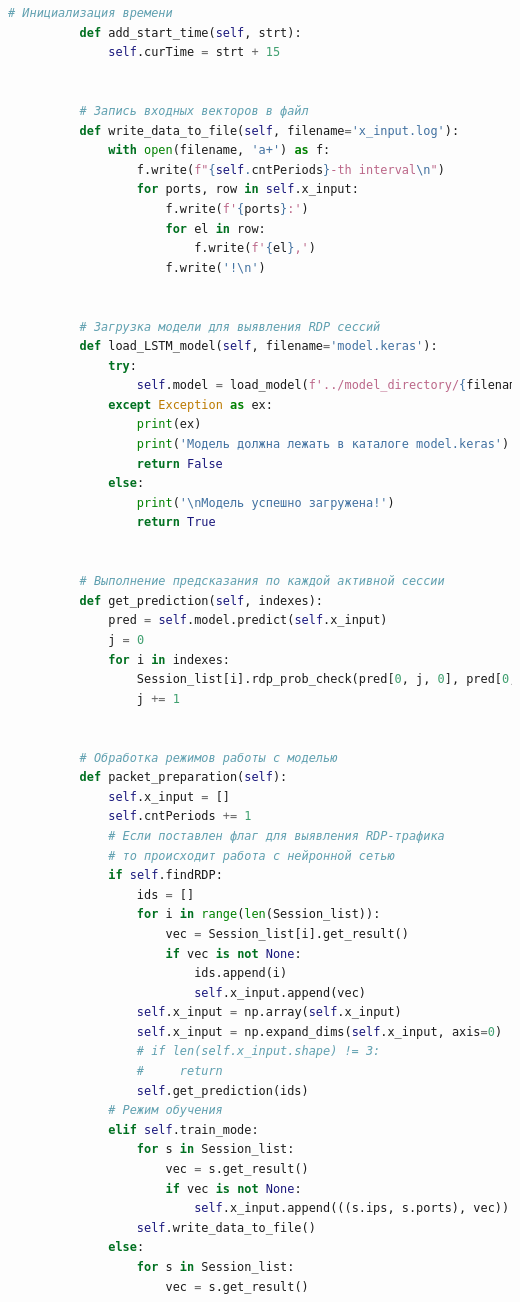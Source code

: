 \documentclass[bachelor, och, coursework]{SCWorks}
\begin{document}
\begin{lstlisting}[language=Python]
          # Инициализация времени
          def add_start_time(self, strt):
              self.curTime = strt + 15
      
      
          # Запись входных векторов в файл
          def write_data_to_file(self, filename='x_input.log'):
              with open(filename, 'a+') as f:
                  f.write(f"{self.cntPeriods}-th interval\n")
                  for ports, row in self.x_input:
                      f.write(f'{ports}:')
                      for el in row:
                          f.write(f'{el},')
                      f.write('!\n')
      
      
          # Загрузка модели для выявления RDP сессий
          def load_LSTM_model(self, filename='model.keras'):
              try:
                  self.model = load_model(f'../model_directory/{filename}')
              except Exception as ex:
                  print(ex)
                  print('Модель должна лежать в каталоге model.keras')
                  return False
              else:
                  print('\nМодель успешно загружена!')
                  return True
      
          
          # Выполнение предсказания по каждой активной сессии
          def get_prediction(self, indexes):
              pred = self.model.predict(self.x_input)
              j = 0
              for i in indexes:
                  Session_list[i].rdp_prob_check(pred[0, j, 0], pred[0, j, 1])
                  j += 1
      
      
          # Обработка режимов работы с моделью
          def packet_preparation(self):
              self.x_input = []
              self.cntPeriods += 1
              # Если поставлен флаг для выявления RDP-трафика
              # то происходит работа с нейронной сетью
              if self.findRDP:
                  ids = []
                  for i in range(len(Session_list)):
                      vec = Session_list[i].get_result()
                      if vec is not None:
                          ids.append(i)
                          self.x_input.append(vec)
                  self.x_input = np.array(self.x_input)
                  self.x_input = np.expand_dims(self.x_input, axis=0)
                  # if len(self.x_input.shape) != 3:
                  #     return
                  self.get_prediction(ids)
              # Режим обучения
              elif self.train_mode:
                  for s in Session_list:
                      vec = s.get_result()
                      if vec is not None:
                          self.x_input.append(((s.ips, s.ports), vec))
                  self.write_data_to_file()
              else:
                  for s in Session_list:
                      vec = s.get_result()
      

\end{lstlisting}
\end{document}
